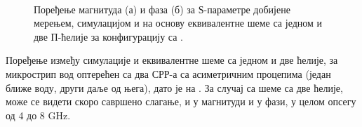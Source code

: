 \documentclass[main.tex]{subfiles}
\begin{document}
\begin{figure}[!t]
\centering
{}\\
\caption{Поређење магнитуда (а) и фаза (б) за $Ѕ$-параметре добијене мерењем, симулацијом и на основу еквивалентне шеме са једном и две П-ћелије за конфигурацију са .} 
\label{f13}
\end{figure}
Поређење између симулације и еквивалентне шеме са једном и две ћелије, за микрострип вод оптерећен са два СРР-а са асиметричним процепима (један ближе воду, други даље од њега), дато је на . За случај са шеме са две ћелије, може се видети скоро савршено слагање, и у магнитуди и у фази, у целом опсегу од 4 до 8 GHz. 
\end{document}
